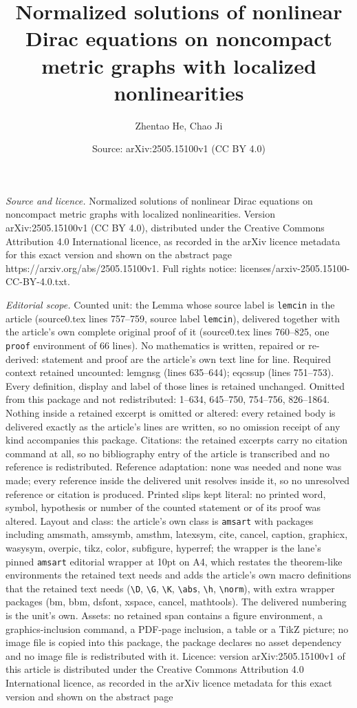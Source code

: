 \documentclass[10pt,a4paper]{amsart}
\title[Normalized solutions of nonlinear Dirac equations on noncomp]{Normalized solutions of nonlinear Dirac equations on noncompact metric graphs with localized nonlinearities}
\author{Zhentao He, Chao Ji}
\date{Source: arXiv:2505.15100v1 (CC BY 4.0)}
\begin{document}
\maketitle

\noindent\emph{Source and licence.} Normalized solutions of nonlinear Dirac equations on noncompact metric graphs with localized nonlinearities. Version arXiv:2505.15100v1 (CC BY 4.0), distributed under the Creative Commons Attribution 4.0 International licence, as recorded in the arXiv licence metadata for this exact version and shown on the abstract page https://arxiv.org/abs/2505.15100v1. Full rights notice: licenses/arxiv-2505.15100-CC-BY-4.0.txt.\par\smallskip

\noindent\textit{Editorial scope.} Counted unit: the Lemma whose source label is \texttt{lemcin} in the article (source0.tex lines 757--759, source label \texttt{lemcin}), delivered together with the article's own complete original proof of it (source0.tex lines 760--825, one \texttt{proof} environment of 66 lines). No mathematics is written, repaired or re-derived: statement and proof are the article's own text line for line. Required context retained uncounted: lemgnsg (lines 635--644); eqcssup (lines 751--753). Every definition, display and label of those lines is retained unchanged. Omitted from this package and not redistributed: 1--634, 645--750, 754--756, 826--1864. Nothing inside a retained excerpt is omitted or altered: every retained body is delivered exactly as the article's lines are written, so no omission receipt of any kind accompanies this package. Citations: the retained excerpts carry no citation command at all, so no bibliography entry of the article is transcribed and no reference is redistributed. Reference adaptation: none was needed and none was made; every reference inside the delivered unit resolves inside it, so no unresolved reference or citation is produced. Printed slips kept literal: no printed word, symbol, hypothesis or number of the counted statement or of its proof was altered. Layout and class: the article's own class is \texttt{amsart} with packages including amsmath, amssymb, amsthm, latexsym, cite, cancel, caption, graphicx, wasysym, overpic, tikz, color, subfigure, hyperref; the wrapper is the lane's pinned \texttt{amsart} editorial wrapper at 10pt on A4, which restates the theorem-like environments the retained text needs and adds the article's own macro definitions that the retained text needs (\texttt{\textbackslash D}, \texttt{\textbackslash G}, \texttt{\textbackslash K}, \texttt{\textbackslash abs}, \texttt{\textbackslash h}, \texttt{\textbackslash norm}), with extra wrapper packages (bm, bbm, dsfont, xspace, cancel, mathtools). The delivered numbering is the unit's own. Assets: no retained span contains a figure environment, a graphics-inclusion command, a PDF-page inclusion, a table or a TikZ picture; no image file is copied into this package, the package declares no asset dependency and no image file is redistributed with it. Licence: version arXiv:2505.15100v1 of this article is distributed under the Creative Commons Attribution 4.0 International licence, as recorded in the arXiv licence metadata for this exact version and shown on the abstract page 
\end{document}
